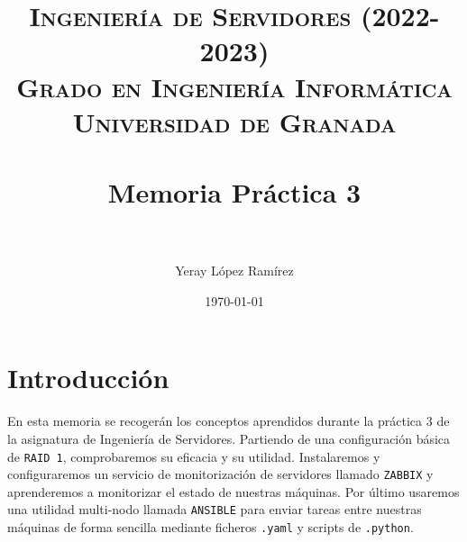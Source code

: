 

\title{	
\normalfont \normalsize 
\textsc{\textbf{Ingeniería de Servidores (2022-2023)} \\ Grado en Ingeniería Informática \\ Universidad de Granada} \\ [25pt] %
\horrule{0.5pt} \\[0.4cm] %
\huge Memoria Práctica 3 \\ %
\horrule{2pt} \\[0.5cm] %
}

\author{Yeray López Ramírez} %

\date{\normalsize\today} %




\maketitle %

\newpage %
\newcommand{\code}[1]{\colorbox{light-gray}{\textcolor{alizarin}{\texttt{#1}}}}
\newcommand{\high}[1]{\colorbox{light-gray}{\textcolor{nyellow}{\texttt{#1}}}}
\tableofcontents %

\listoffigures

\newpage

\section{Introducción}
En esta memoria se recogerán los conceptos aprendidos durante la práctica 3 de la asignatura de Ingeniería de Servidores. Partiendo de una configuración básica de \high{RAID 1}, comprobaremos su eficacia y su utilidad. Instalaremos y configuraremos un servicio de monitorización de servidores llamado \high{ZABBIX} y aprenderemos a monitorizar el estado de nuestras máquinas. Por último usaremos una utilidad multi-nodo llamada \high{ANSIBLE} para enviar tareas entre nuestras máquinas de forma sencilla mediante ficheros \code{.yaml} y scripts de \code{.python}.

